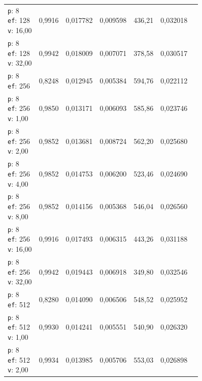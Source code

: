 \begin{table}[htbp]
\begin{tabularx}{\textwidth}{Xrrrrrr}
    \makecell{\texttt{p}: 8\\\texttt{ef}: 128\\\texttt{v}: 16,00} & 0,9916 & 0,017782 & 0,009598 & 436,21 & 0,032018 \\
    \makecell{\texttt{p}: 8\\\texttt{ef}: 128\\\texttt{v}: 32,00} & 0,9942 & 0,018009 & 0,007071 & 378,58 & 0,030517 \\
    \makecell{\texttt{p}: 8\\\texttt{ef}: 256} & 0,8248 & 0,012945 & 0,005384 & 594,76 & 0,022112 \\
    \makecell{\texttt{p}: 8\\\texttt{ef}: 256\\\texttt{v}: 1,00} & 0,9850 & 0,013171 & 0,006093 & 585,86 & 0,023746 \\
    \makecell{\texttt{p}: 8\\\texttt{ef}: 256\\\texttt{v}: 2,00} & 0,9852 & 0,013681 & 0,008724 & 562,20 & 0,025680 \\
    \makecell{\texttt{p}: 8\\\texttt{ef}: 256\\\texttt{v}: 4,00} & 0,9852 & 0,014753 & 0,006200 & 523,46 & 0,024690 \\
    \makecell{\texttt{p}: 8\\\texttt{ef}: 256\\\texttt{v}: 8,00} & 0,9852 & 0,014156 & 0,005368 & 546,04 & 0,026560 \\
    \makecell{\texttt{p}: 8\\\texttt{ef}: 256\\\texttt{v}: 16,00} & 0,9916 & 0,017493 & 0,006315 & 443,26 & 0,031188 \\
    \makecell{\texttt{p}: 8\\\texttt{ef}: 256\\\texttt{v}: 32,00} & 0,9942 & 0,019443 & 0,006918 & 349,80 & 0,032546 \\
    \makecell{\texttt{p}: 8\\\texttt{ef}: 512} & 0,8280 & 0,014090 & 0,006506 & 548,52 & 0,025952 \\
    \makecell{\texttt{p}: 8\\\texttt{ef}: 512\\\texttt{v}: 1,00} & 0,9930 & 0,014241 & 0,005551 & 540,90 & 0,026320 \\
    \makecell{\texttt{p}: 8\\\texttt{ef}: 512\\\texttt{v}: 2,00} & 0,9934 & 0,013985 & 0,005706 & 553,03 & 0,026898 \\

\end{tabularx}
\end{table}
